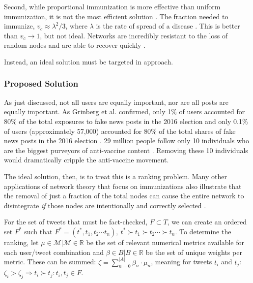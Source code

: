 \documentclass[preprint,review,12pt]{elsarticle}
\begin{document}
Second, while proportional immunization is more effective than uniform immunization, it is not the most efficient solution \cite{dezsHo2002halting,anderson1992infectious}. The fraction needed to immunize, $v_c \approx \lambda^2/3 $, where $\lambda$ is the rate of spread of a disease \cite{pastor2002immunization,barabasi1999emergence}. This is better than $v_c \rightarrow 1$, but not ideal. Networks are incredibly resistant to the loss of random nodes and are able to recover quickly \cite{cohen2001breakdown,callaway2000network,albert2000error}.

Instead, an ideal solution must be targeted in approach.
 
 
 
 \subsubsection{Proposed Solution}
 \label{sec: proposed solution}
 
 As just discussed, not all users are equally important, nor are all posts are equally important. As Grinberg et al. confirmed, only 1\% of users accounted for 80\% of the total exposures to fake news posts in the 2016 election and only 0.1\% of users (approximately 57,000) accounted for 80\% of the total shares of fake news posts in the 2016 election \cite{grinberg2019fake}. 29 million people follow only 10 individuals who are the biggest purveyors of anti-vaccine content \cite{npr2021teachers,ahmed2020antivaxx}. Removing these 10 individuals would dramatically cripple the anti-vaccine movement.
 
 The ideal solution, then, is to treat this is a ranking problem. Many other applications of network theory that focus on immunizations also illustrate that the removal of just a fraction of the total nodes can cause the entire network to disintegrate \textit{if} those nodes are intentionally and correctly selected  \cite{albert2000error,callaway2000network,cohen2003efficient,helleringer2007sexual,cohen2001breakdown,hethcote2014gonorrhea,cohen2000resilience}.
 
 For the set of tweets that must be fact-checked, $F \subset T$, we can create an ordered set $F^*$ such that $F^* = (t^*, t_1, t_2 \cdots t_n), \ t^* \succ t_1 \succ t_2 \cdots \succ t_n$. To determine the ranking, let $\mu \in \mathcal{M} | \mathcal{M} \in \mathbb{R}$ be the set of relevant numerical metrics available for each user/tweet combination and $\beta \in B| B \in \mathbb{R}$ be the set of unique weights per metric. These can be summed: $\zeta = \sum_{n=0}^{|A|} \beta_{n} \cdot \mu_{n}$, meaning for tweets $t_i$ and $t_j$: $\zeta_i > \zeta_j \Rightarrow t_i \succ t_j : t_i, t_j \in F$.
 
\end{document}
